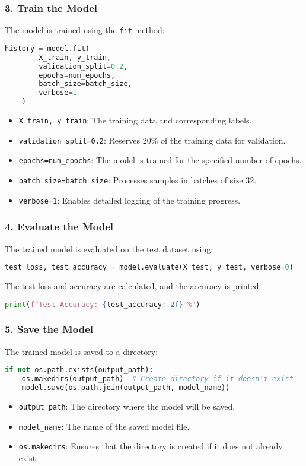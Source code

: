 \subsubsection*{3. Train the Model}
The model is trained using the \texttt{fit} method:
\begin{lstlisting}[language=Python]
	history = model.fit(
		X_train, y_train,
		validation_split=0.2,
		epochs=num_epochs,
		batch_size=batch_size,
		verbose=1
	)
\end{lstlisting}
\begin{itemize}
	\item \texttt{X\_train, y\_train}: The training data and corresponding labels.
	\item \texttt{validation\_split=0.2}: Reserves 20\% of the training data for validation.
	\item \texttt{epochs=num\_epochs}: The model is trained for the specified number of epochs.
	\item \texttt{batch\_size=batch\_size}: Processes samples in batches of size 32.
	\item \texttt{verbose=1}: Enables detailed logging of the training progress.
\end{itemize}

\subsubsection*{4. Evaluate the Model}
The trained model is evaluated on the test dataset using:
\begin{lstlisting}[language=Python]
	test_loss, test_accuracy = model.evaluate(X_test, y_test, verbose=0)
\end{lstlisting}
The test loss and accuracy are calculated, and the accuracy is printed:
\begin{lstlisting}[language=Python]
	print(f"Test Accuracy: {test_accuracy:.2f} %")
\end{lstlisting}

\subsubsection*{5. Save the Model}
The trained model is saved to a directory:
\begin{lstlisting}[language=Python]
	if not os.path.exists(output_path):
	os.makedirs(output_path)  # Create directory if it doesn't exist
	model.save(os.path.join(output_path, model_name))
\end{lstlisting}
\begin{itemize}
	\item \texttt{output\_path}: The directory where the model will be saved.
	\item \texttt{model\_name}: The name of the saved model file.
	\item \texttt{os.makedirs}: Ensures that the directory is created if it does not already exist.
\end{itemize}

